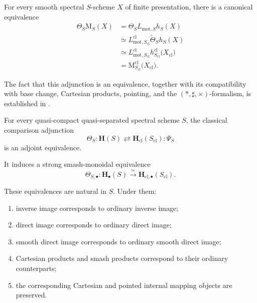\begin{construction}
For every smooth spectral \(S\)-scheme \(X\) of finite presentation,
there is a canonical equivalence
\[
\begin{aligned}
    \Theta_S\mathrm M_S(X)
    &=
    \Theta_SL_{\mathrm{mot},S}h_S(X)
    \\
    &\simeq
    L^{\mathrm{cl}}_{\mathrm{mot},S_{\mathrm{cl}}}
    \widetilde\Theta_Sh_S(X)
    \\
    &\simeq
    L^{\mathrm{cl}}_{\mathrm{mot},S_{\mathrm{cl}}}
    h^{\mathrm{cl}}_{S_{\mathrm{cl}}}
    \bigl(
        X_{\mathrm{cl}}
    \bigr)
    \\
    &=
    \mathrm M^{\mathrm{cl}}_{S_{\mathrm{cl}}}
    \bigl(
        X_{\mathrm{cl}}
    \bigr).
\end{aligned}
\]

The fact that this adjunction is an equivalence, together with its
compatibility with base change, Cartesian products, pointing, and the
\((*,\sharp,\times)\)-formalism, is established in
.
\end{construction}

\begin{theorem}
\label{thm:classical-comparison-brave-new-motivic-spaces}
For every quasi-compact quasi-separated spectral scheme \(S\), the
classical comparison adjunction
\[
    \Theta_S
    \colon
    \mathbf H(S)
    \rightleftarrows
    \mathbf H_{\mathrm{cl}}(S_{\mathrm{cl}})
    :
    \Psi_S
\]
is an adjoint equivalence.

It induces a strong smash-monoidal equivalence
\[
    \Theta_{S,\bullet}
    \colon
    \mathbf H_\bullet(S)
    \xrightarrow{\simeq}
    \mathbf H_{\mathrm{cl},\bullet}(S_{\mathrm{cl}}).
\]

These equivalences are natural in \(S\).  Under them:
\begin{enumerate}[label=(\roman*)]
    \item inverse image corresponds to ordinary inverse image;

    \item direct image corresponds to ordinary direct image;

    \item smooth direct image corresponds to ordinary smooth direct
    image;

    \item Cartesian products and smash products correspond to their
    ordinary counterparts;

    \item the corresponding Cartesian and pointed internal mapping
    objects are preserved.
\end{enumerate}
\end{theorem}

